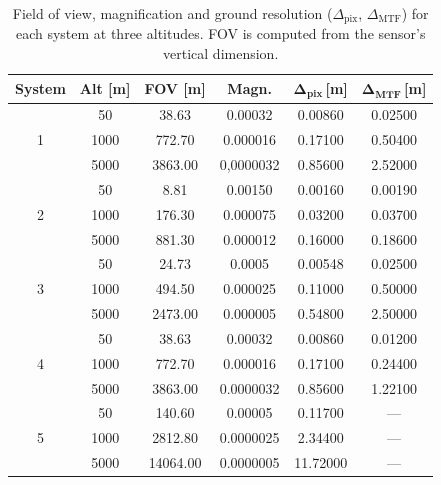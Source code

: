 \begin{table}[H]
    \centering
    \footnotesize
    \setlength{\tabcolsep}{6pt}
    \caption{Field of view, magnification and ground resolution
             (\(\Delta_\text{pix}\), \(\Delta_\text{MTF}\)) for each
             system at three altitudes.  FOV is computed from the
             sensor’s vertical dimension.}
    \label{tab:grd_fov_clean}
    \begin{tabular}{|c|c|c|c|c|c|}
        \hline
        \rowcolor[HTML]{EFEFEF}
        \textbf{System} & \textbf{Alt [m]} & \textbf{FOV [m]} & 
        \textbf{Magn.} & \(\boldsymbol{\Delta_\text{pix}}\)\,[m] & 
        \(\boldsymbol{\Delta_\text{MTF}}\)\,[m] \\ 
        \hline
        
        \multirow{3}{*}{1} 
         & 50   & 38.63  & 0.00032   & 0.00860  & 0.02500   \\ 
         & 1000 & 772.70 & 0.000016   & 0.17100  & 0.50400   \\ 
         & 5000 & 3863.00& 0,0000032   & 0.85600  & 2.52000   \\ 
        \hline
        
        \multirow{3}{*}{2}
         & 50   & 8.81   & 0.00150   & 0.00160  & 0.00190  \\ 
         & 1000 & 176.30 & 0.000075   & 0.03200  & 0.03700   \\ 
         & 5000 & 881.30 & 0.000012   & 0.16000  & 0.18600   \\ 
        \hline
        
        \multirow{3}{*}{3}
         & 50   & 24.73  & 0.0005   & 0.00548  & 0.02500   \\ 
         & 1000 & 494.50 & 0.000025   & 0.11000  & 0.50000   \\ 
         & 5000 & 2473.00& 0.000005   & 0.54800  & 2.50000   \\ 
        \hline
        
        \multirow{3}{*}{4}
         & 50   & 38.63  & 0.00032   & 0.00860  & 0.01200   \\ 
         & 1000 & 772.70 & 0.000016   & 0.17100  & 0.24400   \\ 
         & 5000 & 3863.00& 0.0000032   & 0.85600  & 1.22100   \\ 
        \hline
        
        \multirow{3}{*}{5}
         & 50   & 140.60 & 0.00005   & 0.11700  & —         \\ 
         & 1000 & 2812.80& 0.0000025   & 2.34400  & —         \\ 
         & 5000 & 14064.00&0.0000005   & 11.72000 & —         \\ 
        \hline
        

\end{tabular}
\end{table}
